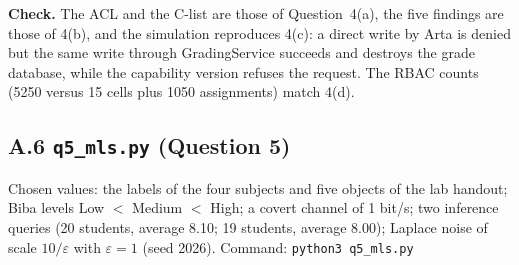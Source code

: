 \documentclass[11pt,a4paper]{article}
\begin{document}
\textbf{Check.} The ACL and the C-list are those of Question~4(a), the five findings are those of 4(b), and the
simulation reproduces 4(c): a direct write by Arta is denied but the same write through GradingService succeeds
and destroys the grade database, while the capability version refuses the request. The RBAC counts
(5250 versus 15 cells plus 1050 assignments) match 4(d).

\needspace{25.0cm}
\subsection*{A.6 \texttt{q5\_mls.py} (Question 5)}
Chosen values: the labels of the four subjects and five objects of the lab handout; Biba levels Low $<$ Medium $<$
High; a covert channel of 1 bit/s; two inference queries (20 students, average 8.10; 19 students, average 8.00);
Laplace noise of scale $10/\varepsilon$ with $\varepsilon=1$ (seed 2026). Command: \texttt{python3 q5\_mls.py}
\end{document}
